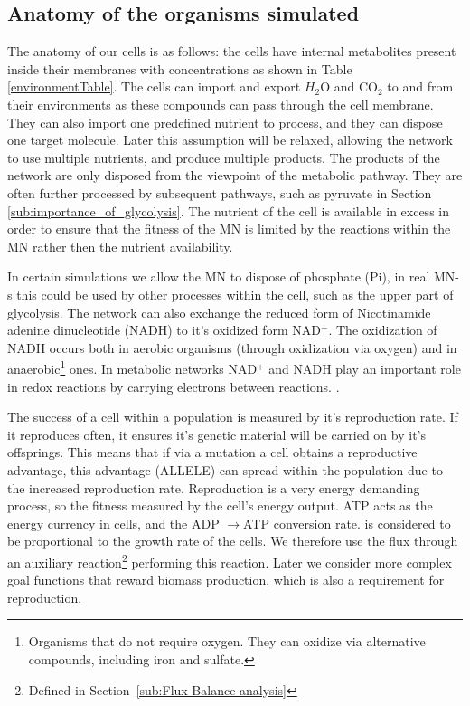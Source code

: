 \documentclass[a4paper,12pt]{article}
\begin{document}
	\subsection{Anatomy of the organisms simulated}
	\label{ssub:anatomy_of_the_oganisms_simulated}
	
	The anatomy of our cells is as follows: the cells have internal metabolites present inside  their membranes with concentrations as shown in Table \ref{environmentTable}. The cells can import and export $H_2$O and CO$_2$ to and from their environments as these compounds can pass through the cell membrane. They can also import one predefined nutrient to process, and they can dispose one target molecule. Later this assumption will be relaxed, allowing the network to use multiple nutrients, and produce multiple products. The products of the network are only disposed from the viewpoint of the metabolic pathway. They are often further processed by subsequent pathways, such as pyruvate in Section \ref{sub:importance_of_glycolysis}. The nutrient of the cell is available in excess in order to ensure that the fitness of the MN is limited by the reactions within the MN rather then the nutrient availability. 
	
	In certain simulations we allow the MN to dispose of phosphate (Pi), in real MN-s this could be used by other processes within the cell, such as the upper part of glycolysis. The network can also exchange the reduced form of Nicotinamide adenine dinucleotide (NADH) to it's oxidized form NAD$^+$. The oxidization of NADH occurs both in aerobic organisms (through oxidization via oxygen) and in anaerobic\footnote{ Organisms that do not require oxygen. They can oxidize via alternative compounds, including iron and sulfate.} ones. In metabolic networks NAD$^+$ and NADH play an important role in redox reactions by carrying electrons between reactions. \cite{principlesofbio}.

	The success of a cell within a population is measured by it's reproduction rate. If it reproduces often, it ensures it's genetic material will be carried on by it's offsprings. This means that if via a mutation a cell obtains a reproductive advantage, this advantage (ALLELE)  can spread within the population due to the increased reproduction rate. Reproduction is a very energy demanding process, so the fitness  measured by the cell's energy output. ATP acts as the energy currency in cells, and the ADP $\rightarrow$ATP conversion rate. is considered to be proportional to the growth rate of the cells. We therefore use the flux through an auxiliary reaction\footnote{Defined in Section~\ref{sub:Flux Balance analysis}} performing this reaction.  Later we consider more complex goal functions that reward biomass production, which is also a requirement for reproduction. 
\end{document}
